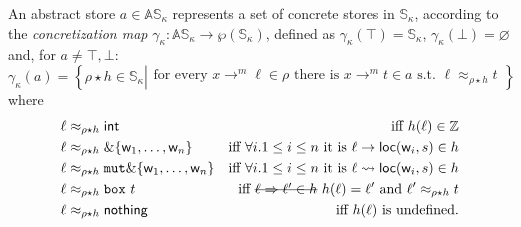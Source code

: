 \begin{definition}\label{def:concretization}
  An abstract store $a\in\mathbb{AS}_\kappa$ represents a set of concrete stores
  in $\mathbb{S}_\kappa$, according to the \emph{concretization map}
  $\gamma_\kappa:\mathbb{AS}_\kappa\to\wp(\mathbb{S}_\kappa)$, defined as
  $\gamma_\kappa(\top)=\mathbb{S}_\kappa$, $\gamma_\kappa(\bot)=\varnothing$ and, for $a\not=\top,\bot$:
  \[
  \gamma_\kappa(a)=\left\{\rho\star h\in\mathbb{S}_\kappa\left|\begin{array}{l}
  \text{for every }x\to^m\ell\in\rho\text{ there is }x\to^m t\in a\text{ s.t.\ }\ell\approx_{\rho\star h}t
  \end{array}
  \right.\right\}
  \]
  where
  \begin{align*}
    \ell&\approx_{\rho\star h}\mathsf{int} & \text{iff $h(\ell)\in\mathbb{Z}$}\\
    \ell&\approx_{\rho\star h}\borrow\{\mathsf{w}_1,\ldots,\mathsf{w}_n\} & \text{iff $\forall i.1\le i\le n$ it is }\ell\to\loc(\mathsf{w}_i,s)\in h\\
    \ell&\approx_{\rho\star h}\mathtt{mut}\borrow\{\mathsf{w}_1,\ldots,\mathsf{w}_n\} & \text{iff $\forall i.1\le i\le n$ it is }\ell\leadsto\loc(\mathsf{w}_i,s)\in h\\
    \ell&\approx_{\rho\star h}\mathtt{box}\ t & \text{iff \sout{$\ell\Rightarrow\ell'\in h$} $h(\ell)=\ell'$ and $\ell'\approx_{\rho\star h}t$}\\
    \ell&\approx_{\rho\star h}\mathsf{nothing} & \text{iff $h(\ell)$ is undefined.}
  \end{align*}
\end{definition}


